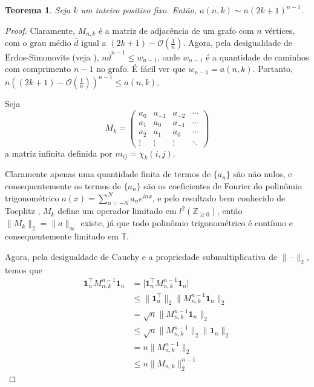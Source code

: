 \documentclass[a4paper,12pt]{article}
\newtheorem{theorem}{Teorema}
\theoremstyle{definition}
\begin{document}
\begin{theorem} \label{th:asymptotic} Seja $k$ um inteiro positivo fixo. Então, $a(n, k) \sim n(2k+1)^{n-1}$. \end{theorem} \begin{proof} Claramente, $M_{n,k}$ é a matriz de adjacência de um grafo com $n$ vértices, com o grau médio $\overline{d}$ igual a $(2k + 1) - \mathcal{O}(\frac{1}{n})$. Agora, pela desigualdade de Ërdos-Simonovits (veja \cite{erdos-simonovits}), $n \overline{d}^{n-1} \le w_{n-1}$, onde $w_{n-1}$ é a quantidade de caminhos com comprimento $n-1$ no grafo. É fácil ver que $w_{n-1} = a(n, k)$. Portanto, $n ((2k + 1) - \mathcal{O}(\frac{1}{n}))^{n-1} \le a(n, k)$.

  Seja \[M_k = \begin{pmatrix} a_{0} & a_{-1} & a_{-2} & \cdots \\ a_{1} & a_{0} & a_{-1} & \cdots \\ a_2 & a_{1} & a_{0} & \cdots \\ \vdots & \vdots & \vdots & \ddots \end{pmatrix}\] a matriz infinita definida por $m_{ij} = \chi_k(i, j)$.

  Claramente apenas uma quantidade finita de termos de $\{a_n\}$ são não nulos, e consequentemente os termos de $\{ a_n \}$ são os coeficientes de Fourier do polinômio trigonométrico $a(x) = \sum_{n = -N}^N a_n e^{i n x}$, e pelo resultado bem conhecido de Toeplitz \cite{toeplitz}, $M_k$ define um operador limitado em $l^2(\mathbb{Z}_{\ge 0})$, então $\|M_k\|_2 = \| a \|_{\infty}$ existe, já que todo polinômio trigonométrico é contínuo e consequentemente limitado em $\mathbb{T}$.

  Agora, pela desigualdade de Cauchy e a propriedade submultiplicativa de $\| \cdot \|_2$, temos que
  \begin{align*}
    \mathbf{1}_n^\intercal M_{n,k}^{n-1} \mathbf{1}_n & = \lvert \mathbf{1}_n^\intercal M_{n,k}^{n-1} \mathbf{1}_n\rvert      \\
                                                      & \le \| \mathbf{1}_n^\intercal \|_2 \| M_{n,k}^{n-1} \mathbf{1}_n \|_2 \\
                                                      & = \sqrt{n} \| M_{n,k}^{n-1} \mathbf{1}_n \|_2                         \\
                                                      & \le \sqrt{n} \| M_{n,k}^{n-1} \|_2 \| \mathbf{1}_n \|_2               \\
                                                      & = n \| M_{n,k}^{n-1} \|_2                                             \\
                                                      & \le n \| M_{n,k} \|_2^{n-1}
  \end{align*}


\end{proof}
\end{document}
